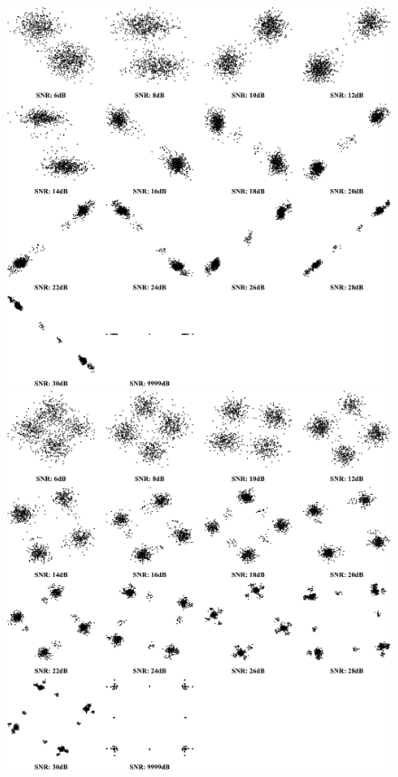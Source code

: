 {
    \begin{figure}[!htbp]
        \centering
        \begin{minipage}{0.48\textwidth}
            \centering
            \includegraphics[scale=0.15]{img/constellations/cropped_constellationBPSK.pdf}
        \end{minipage}
        \hfill
        \begin{minipage}{0.48\textwidth}
            \centering
            \includegraphics[scale=0.15]{img/constellations/cropped_constellationQPSK.pdf}
        \end{minipage}
    \end{figure}
}



